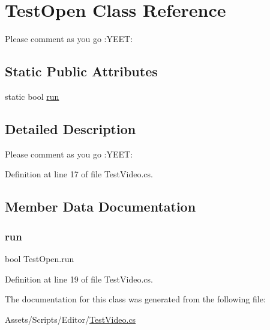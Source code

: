 \hypertarget{class_test_open}{}\section{Test\+Open Class Reference}
\label{class_test_open}


Please comment as you go \+:Y\+E\+ET\+:  


\subsection*{Static Public Attributes}
\begin{DoxyCompactItemize}
\item 
static bool \mbox{\hyperlink{class_test_open_a67d75af7933f182fe53a06defce16890}{run}}
\end{DoxyCompactItemize}


\subsection{Detailed Description}
Please comment as you go \+:Y\+E\+ET\+: 



Definition at line 17 of file Test\+Video.\+cs.



\subsection{Member Data Documentation}
\mbox{\label{class_test_open_a67d75af7933f182fe53a06defce16890}} 
\subsubsection{\texorpdfstring{run}{run}}
{\footnotesize\ttfamily bool Test\+Open.\+run\hspace{0.3cm}{\ttfamily [static]}}



Definition at line 19 of file Test\+Video.\+cs.



The documentation for this class was generated from the following file\+:\begin{DoxyCompactItemize}
\item 
Assets/\+Scripts/\+Editor/\mbox{\hyperlink{_test_video_8cs}{Test\+Video.\+cs}}\end{DoxyCompactItemize}
